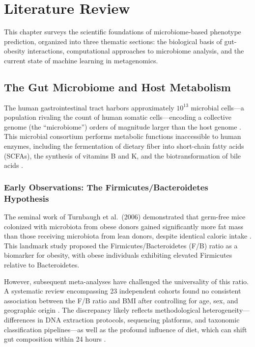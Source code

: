 
\chapter{Literature Review}
\label{ch:literature}

This chapter surveys the scientific foundations of microbiome-based phenotype prediction, organized into three thematic sections: the biological basis of gut-obesity interactions, computational approaches to microbiome analysis, and the current state of machine learning in metagenomics.

\section{The Gut Microbiome and Host Metabolism}

The human gastrointestinal tract harbors approximately $10^{13}$ microbial cells---a population rivaling the count of human somatic cells---encoding a collective genome (the ``microbiome'') orders of magnitude larger than the host genome \cite{sender2016revised}. This microbial consortium performs metabolic functions inaccessible to human enzymes, including the fermentation of dietary fiber into short-chain fatty acids (SCFAs), the synthesis of vitamins B and K, and the biotransformation of bile acids \cite{rowland2018gut}.

\subsection{Early Observations: The Firmicutes/Bacteroidetes Hypothesis}

The seminal work of Turnbaugh et al.\ (2006) demonstrated that germ-free mice colonized with microbiota from obese donors gained significantly more fat mass than those receiving microbiota from lean donors, despite identical caloric intake \cite{turnbaugh2006obesity}. This landmark study proposed the Firmicutes/Bacteroidetes (F/B) ratio as a biomarker for obesity, with obese individuals exhibiting elevated Firmicutes relative to Bacteroidetes.

However, subsequent meta-analyses have challenged the universality of this ratio. A systematic review encompassing 23 independent cohorts found no consistent association between the F/B ratio and BMI after controlling for age, sex, and geographic origin \cite{magne2020firmicutes}. The discrepancy likely reflects methodological heterogeneity---differences in DNA extraction protocols, sequencing platforms, and taxonomic classification pipelines---as well as the profound influence of diet, which can shift gut composition within 24 hours \cite{david2014diet}.

